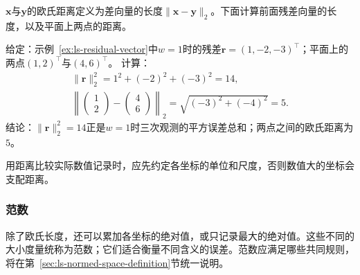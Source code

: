 $\bm x$与$\bm y$的欧氏距离定义为差向量的长度$\lVert\bm x-\bm y\rVert_2$。下面计算前面残差向量的长度，以及平面上两点的距离。
\begin{example}[长度与距离的计算]
\label{ex:ls-length-distance}
给定：示例~\ref{ex:ls-residual-vector}中$w=1$时的残差$\bm r=(1,-2,-3)^\top$；平面上的两点$(1,2)^\top$与$(4,6)^\top$。
计算：
\[
 \begin{gathered}
 \lVert\bm r\rVert_2^2=1^2+(-2)^2+(-3)^2=14,\\
 \left\lVert\begin{pmatrix}1\\2\end{pmatrix}-\begin{pmatrix}4\\6\end{pmatrix}\right\rVert_2=\sqrt{(-3)^2+(-4)^2}=5.
 \end{gathered}
\]
结论：$\lVert\bm r\rVert_2^2=14$正是$w=1$时三次观测的平方误差总和；两点之间的欧氏距离为$5$。
\end{example}
用距离比较实际数值记录时，应先约定各坐标的单位和尺度，否则数值大的坐标会支配距离。

\subsubsection{范数}

除了欧氏长度，还可以累加各坐标的绝对值，或只记录最大的绝对值。这些不同的大小度量统称为范数；它们适合衡量不同含义的误差。范数应满足哪些共同规则，将在第~\ref{sec:ls-normed-space-definition}节统一说明。

